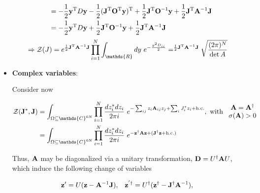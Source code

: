 \documentclass{homework}
\begin{document}
\begin{itemize}
\begin{equation}
\begin{split}
        &= - \frac{1}{2} {\bf y}^{\textnormal{T}} D {\bf y} -  \frac{1}{2} ({\bf J}^{\textnormal{T}}{\bf O}^{\textnormal{T}} {\bf y})^{\textnormal{T}} +  \frac{1}{2} {\bf J}^{\textnormal{T}} {\bf O}^{-1} {\bf y} + \frac{1}{2} {{\bf J}}^{\textnormal{T}} {\bf A}^{-1} {\bf J} \\
        &= - \frac{1}{2} {\bf y}^{\textnormal{T}} D {\bf y} +  \frac{1}{2} {\bf J}^{\textnormal{T}} {\bf O}^{-1} {\bf y} + \frac{1}{2} {{\bf J}}^{\textnormal{T}} {\bf A}^{-1} {\bf J} \\
\end{split}
\end{equation}
\begin{equation}
    \begin{split}
&\Rightarrow \mathcal{Z}(J) = e^{\frac{1}{2} {{\bf J}}^{\textnormal{T}} {\bf A}^{-1} {\bf J}} \prod_{i=1}^{N} \int_{\mathds{R}} dy \blanky e^{-\frac{y^2 D_{ii}}{2}} = ^{\frac{1}{2} {{\bf J}}^{\textnormal{T}} {\bf A}^{-1} {\bf J}} \sqrt {\frac {(2\pi )^{N}}{\det A}}
    \end{split}
\end{equation}

\clearpage

\item \textbf{Complex variables}: 

Consider now 

\begin{equation} \begin{split}
    \mathcal{Z}({\bf J}^*, {\bf J}) &= \int_{\Omega \subseteq \mathds{C}^{6N}} \prod_{i=1}^{N} \frac{dz_i^* dz_i}{2\pi i} \blanky e^{ - \sum_{ij} z_i {\bf A}_{ij} z_j + \sum_{i} J_i^* z_i + \textnormal{h.c.}}, \textnormal{ with } \begin{array}{c}
            {{\bf A}} = {{\bf A}}^\dagger \\
            \sigma({{\bf A}}) > 0 
        \end{array} \\
        &= \int_{\Omega \subseteq \mathds{C}^{6N}} \prod_{i=1}^{N} \frac{dz_i^* dz_i}{2\pi i} \blanky e^{ - {\bf z}^\dagger {\bf A} {\bf z} + ({\bf J}^\dagger {\bf z} + \textnormal{h.c.})}
        \end{split}
    \end{equation}

Thus, ${\bf A}$ may be diagonalized via a unitary transformation, ${\bf D} = U^\dagger {\bf A} U$, which induce the following change of variables

\begin{align}
    {\bf z}' &= U({\bf z} - {\bf A}^{-1} {\bf J}), & {\bf z}^{'\dagger} &= U^\dagger({\bf z}^\dagger -  {\bf J}^\dagger{\bf A}^{-1}),
\end{align}


\end{itemize}
\end{document}
